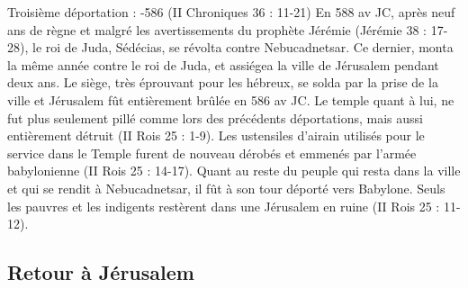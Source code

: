 Troisième déportation : -586 (II Chroniques 36 : 11-21)
En 588 av JC, après neuf ans de règne et malgré les avertissements du prophète Jérémie (Jérémie 38 : 17-28), le roi de Juda, Sédécias, se révolta contre Nebucadnetsar. Ce dernier, monta la même année contre le roi de Juda, et assiégea la ville de Jérusalem pendant deux ans. Le siège, très éprouvant pour les hébreux, se solda par la prise de la ville et Jérusalem fût entièrement brûlée en 586 av JC. Le temple quant à lui, ne fut plus seulement pillé comme lors des précédents déportations, mais aussi entièrement détruit (II Rois 25 : 1-9). Les ustensiles d'airain utilisés pour le service dans le Temple furent de nouveau dérobés et emmenés par l'armée babylonienne (II Rois 25 : 14-17). Quant au reste du peuple qui resta dans la ville et qui se rendit à Nebucadnetsar, il fût à son tour déporté vers Babylone. Seuls les pauvres et les indigents restèrent dans une Jérusalem en ruine (II Rois 25 : 11-12).

\subsection*{Retour à Jérusalem}

